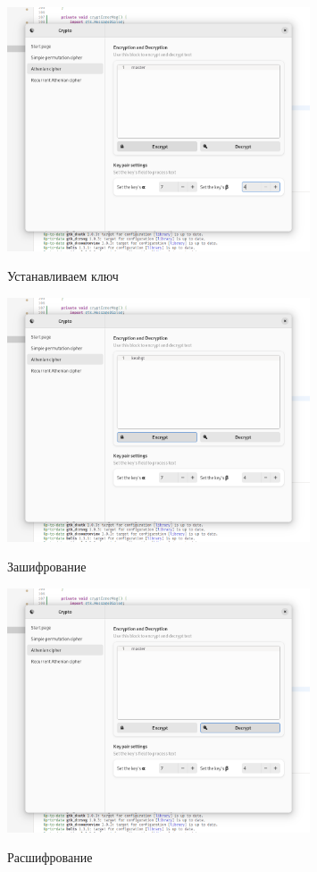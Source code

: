 \documentclass[a4paper]{article}
\begin{document}
  \begin{figure}[H]  
    \centering
    \caption{Устанавливаем ключ}
    \includegraphics[width=0.8\textwidth]{01_0006}
    \label{img:0006}
  \end{figure}

  \begin{figure}[H]  
    \centering
    \caption{Зашифрование}
    \includegraphics[width=0.8\textwidth]{01_0007}
    \label{img:0007}
  \end{figure}

  \begin{figure}[H]  
    \centering
    \caption{Расшифрование}
    \includegraphics[width=0.8\textwidth]{01_0008}
    \label{img:0008}
  \end{figure}
\end{document}
